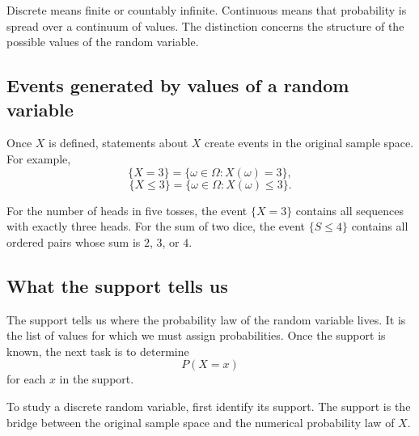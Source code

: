 \begin{remarkbox}
Discrete means finite or countably infinite. Continuous means that probability is
spread over a continuum of values. The distinction concerns the structure of the
possible values of the random variable.
\end{remarkbox}

\subsection*{Events generated by values of a random variable}

Once \(X\) is defined, statements about \(X\) create events in the original
sample space. For example,
\[
\{X=3\}=\{\omega\in\Omega:X(\omega)=3\},
\]
\[
\{X\leq 3\}=\{\omega\in\Omega:X(\omega)\leq 3\}.
\]

For the number of heads in five tosses, the event \(\{X=3\}\) contains all
sequences with exactly three heads. For the sum of two dice, the event
\(\{S\leq 4\}\) contains all ordered pairs whose sum is \(2\), \(3\), or \(4\).

\subsection*{What the support tells us}

The support tells us where the probability law of the random variable lives. It
is the list of values for which we must assign probabilities. Once the support is
known, the next task is to determine
\[
P(X=x)
\]
for each \(x\) in the support.

\begin{theorembox}
To study a discrete random variable, first identify its support. The support is
the bridge between the original sample space and the numerical probability law of
\(X\).
\end{theorembox}

